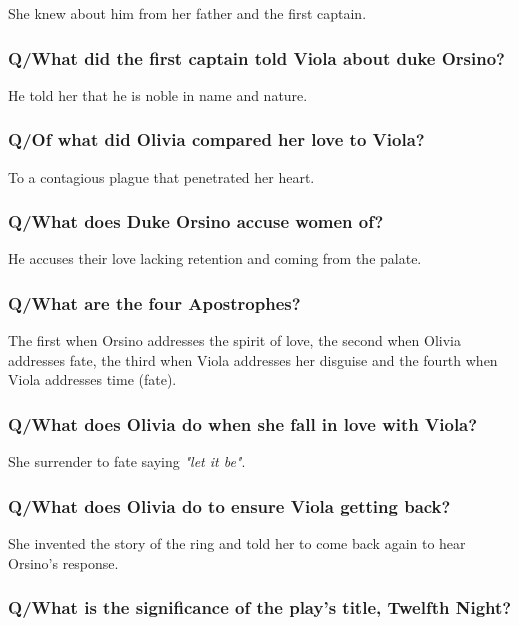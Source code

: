 \documentclass[12pt, a4paper]{article}
\begin{document}
She knew about him from her father and the first captain.

\subsubsection*{Q/What did the first captain told Viola about duke Orsino?}

He told her that he is noble in name and nature.

\subsubsection*{Q/Of what did Olivia compared her love to Viola?}

To a contagious plague that penetrated her heart.

\subsubsection*{Q/What does Duke Orsino accuse women of?}

He accuses their love lacking retention and coming from the palate.

\subsubsection*{Q/What are the four Apostrophes?}

The first when Orsino addresses the spirit of love, the second when Olivia addresses 
fate, the third when Viola addresses her disguise and the fourth when Viola addresses time (fate).

\subsubsection*{Q/What does Olivia do when she fall in love with Viola?}

She surrender to fate saying \textit{"let it be"}.

\subsubsection*{Q/What does Olivia do to ensure Viola getting back?}

She invented the story of the ring and told her to come back again to hear
Orsino's response.

\subsubsection*{Q/What is the significance of the play’s title, Twelfth Night?}
\end{document}
